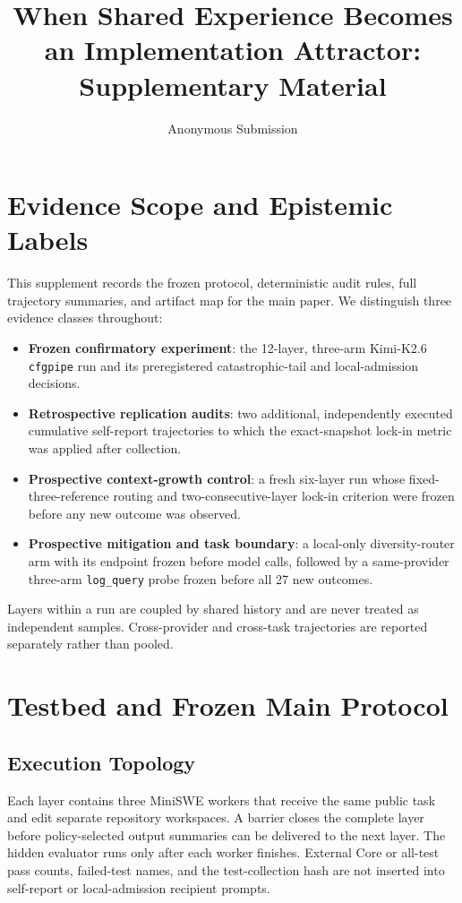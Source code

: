 \documentclass[letterpaper]{article}
\title{When Shared Experience Becomes an Implementation Attractor:\\Supplementary Material}
\author{Anonymous Submission}
\begin{document}
\maketitle
\enlargethispage{40pt}

\section{Evidence Scope and Epistemic Labels}

This supplement records the frozen protocol, deterministic audit rules, full
trajectory summaries, and artifact map for the main paper. We distinguish
three evidence classes throughout:
\begin{itemize}
    \item \textbf{Frozen confirmatory experiment}: the 12-layer, three-arm
    Kimi-K2.6 \texttt{cfgpipe} run and its preregistered catastrophic-tail and
    local-admission decisions.
    \item \textbf{Retrospective replication audits}: two additional,
    independently executed cumulative self-report trajectories to which the
    exact-snapshot lock-in metric was applied after collection.
    \item \textbf{Prospective context-growth control}: a fresh six-layer run whose
    fixed-three-reference routing and two-consecutive-layer lock-in criterion
    were frozen before any new outcome was observed.
    \item \textbf{Prospective mitigation and task boundary}: a local-only
    diversity-router arm with its endpoint frozen before model calls, followed
    by a same-provider three-arm \texttt{log\_query} probe frozen before all 27
    new outcomes.
\end{itemize}
Layers within a run are coupled by shared history and are never treated as
independent samples. Cross-provider and cross-task trajectories are reported
separately rather than pooled.

\section{Testbed and Frozen Main Protocol}

\subsection{Execution Topology}

Each layer contains three MiniSWE workers that receive the same public task and
edit separate repository workspaces. A barrier closes the complete layer
before policy-selected output summaries can be delivered to the next layer.
The hidden evaluator runs only after each worker finishes. External Core or
all-test pass counts, failed-test names, and the test-collection hash are not
inserted into self-report or local-admission recipient prompts.
\end{document}
